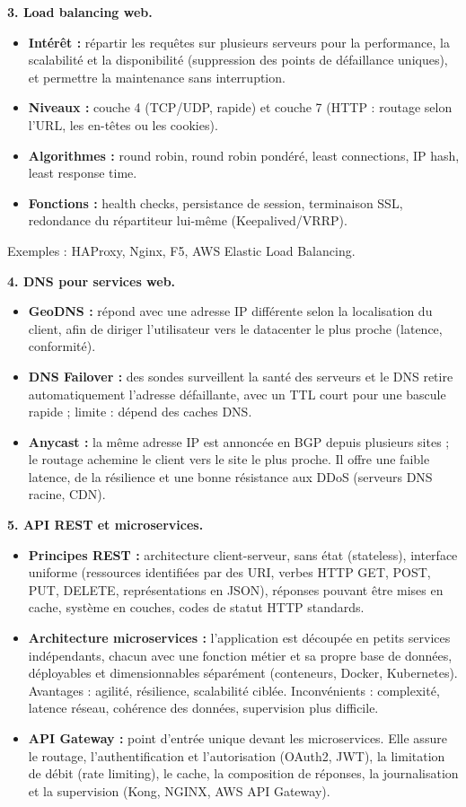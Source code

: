 \documentclass[12pt,a4paper]{article}
\begin{document}
\textbf{3. Load balancing web.}
\begin{itemize}
    \item \textbf{Intérêt :} répartir les requêtes sur plusieurs
    serveurs pour la performance, la scalabilité et la disponibilité
    (suppression des points de défaillance uniques), et permettre la
    maintenance sans interruption.
    \item \textbf{Niveaux :} couche 4 (TCP/UDP, rapide) et couche 7
    (HTTP : routage selon l'URL, les en-têtes ou les cookies).
    \item \textbf{Algorithmes :} round robin, round robin pondéré, least
    connections, IP hash, least response time.
    \item \textbf{Fonctions :} health checks, persistance de session,
    terminaison SSL, redondance du répartiteur lui-même
    (Keepalived/VRRP).
\end{itemize}
Exemples : HAProxy, Nginx, F5, AWS Elastic Load Balancing.

\textbf{4. DNS pour services web.}
\begin{itemize}
    \item \textbf{GeoDNS :} répond avec une adresse IP différente selon
    la localisation du client, afin de diriger l'utilisateur vers le
    datacenter le plus proche (latence, conformité).
    \item \textbf{DNS Failover :} des sondes surveillent la santé des
    serveurs et le DNS retire automatiquement l'adresse défaillante, avec
    un TTL court pour une bascule rapide ; limite : dépend des caches
    DNS.
    \item \textbf{Anycast :} la même adresse IP est annoncée en BGP
    depuis plusieurs sites ; le routage achemine le client vers le site
    le plus proche. Il offre une faible latence, de la résilience et une
    bonne résistance aux DDoS (serveurs DNS racine, CDN).
\end{itemize}

\textbf{5. API REST et microservices.}
\begin{itemize}
    \item \textbf{Principes REST :} architecture client-serveur, sans
    état (stateless), interface uniforme (ressources identifiées par des
    URI, verbes HTTP GET, POST, PUT, DELETE, représentations en JSON),
    réponses pouvant être mises en cache, système en couches, codes de
    statut HTTP standards.
    \item \textbf{Architecture microservices :} l'application est
    découpée en petits services indépendants, chacun avec une fonction
    métier et sa propre base de données, déployables et dimensionnables
    séparément (conteneurs, Docker, Kubernetes). Avantages : agilité,
    résilience, scalabilité ciblée. Inconvénients : complexité, latence
    réseau, cohérence des données, supervision plus difficile.
    \item \textbf{API Gateway :} point d'entrée unique devant les
    microservices. Elle assure le routage, l'authentification et
    l'autorisation (OAuth2, JWT), la limitation de débit (rate limiting),
    le cache, la composition de réponses, la journalisation et la
    supervision (Kong, NGINX, AWS API Gateway).
\end{itemize}
\end{document}
